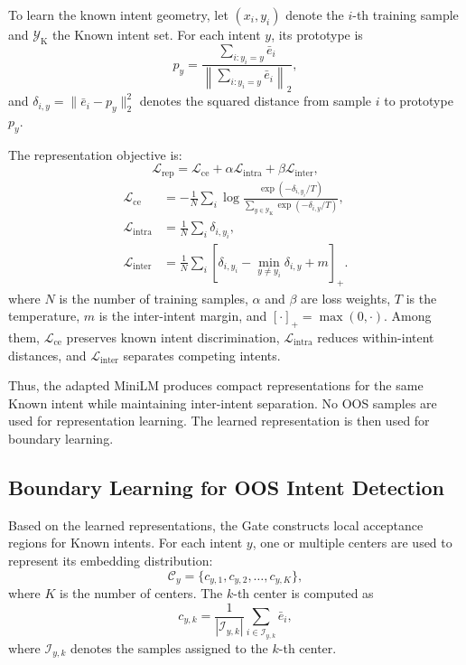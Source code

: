 \documentclass[11pt]{article}
\begin{document}
To learn the known intent geometry, let $(x_i,y_i)$ denote the $i$-th training sample and $\mathcal{Y}_{\mathrm K}$ the Known intent set. For each intent $y$, its prototype is
\begin{equation}
p_y=
\frac{
\sum_{i:y_i=y}\bar e_i
}{
\left\|
\sum_{i:y_i=y}\bar e_i
\right\|_2
},
\label{eq:training_prototype}
\end{equation}
and $\delta_{i,y}=\|\bar e_i-p_y\|_2^2$ denotes the squared distance from sample $i$ to prototype $p_y$.

The representation objective is:
\begin{equation}
\mathcal{L}_{\mathrm{rep}}
=
\mathcal{L}_{\mathrm{ce}}
+\alpha\mathcal{L}_{\mathrm{intra}}
+\beta\mathcal{L}_{\mathrm{inter}},
\label{eq:rep_loss}
\end{equation}
\begin{align}
\mathcal{L}_{\mathrm{ce}}
&=
-\frac{1}{N}\sum_i
\log
\frac{\exp(-\delta_{i,y_i}/T)}
{\sum_{y\in\mathcal{Y}_{\mathrm K}}\exp(-\delta_{i,y}/T)},\\
\mathcal{L}_{\mathrm{intra}}
&=\frac{1}{N}\sum_i\delta_{i,y_i},\\
\mathcal{L}_{\mathrm{inter}}
&=
\frac{1}{N}\sum_i
\left[
\delta_{i,y_i}-\min_{y\neq y_i}\delta_{i,y}+m
\right]_{+}.
\label{eq:rep_terms}
\end{align}
where $N$ is the number of training samples, $\alpha$ and $\beta$ are loss weights, $T$ is the temperature, $m$ is the inter-intent margin, and $[\cdot]_+=\max(0,\cdot)$. Among them, $\mathcal{L}_{\mathrm{ce}}$ preserves known intent discrimination, $\mathcal{L}_{\mathrm{intra}}$ reduces within-intent distances, and $\mathcal{L}_{\mathrm{inter}}$ separates competing intents.

Thus, the adapted MiniLM produces compact representations for the same Known intent while maintaining inter-intent separation. No OOS samples are used for representation learning. The learned representation is then used for boundary learning.

\subsection{Boundary Learning for OOS Intent Detection}
\label{sec:boundary}

Based on the learned representations, the Gate constructs local acceptance regions for Known intents. For each intent $y$, one or multiple centers are used to represent its embedding distribution:
\begin{equation}
\mathcal{C}_y
=
\{c_{y,1},c_{y,2},\ldots,c_{y,K}\},
\label{eq:center_set}
\end{equation}
where $K$ is the number of centers. The $k$-th center is computed as
\begin{equation}
c_{y,k}
=
\frac{1}{|\mathcal{I}_{y,k}|}
\sum_{i\in\mathcal{I}_{y,k}}
\bar e_i,
\label{eq:center}
\end{equation}
where $\mathcal{I}_{y,k}$ denotes the samples assigned to the $k$-th center.
\end{document}
